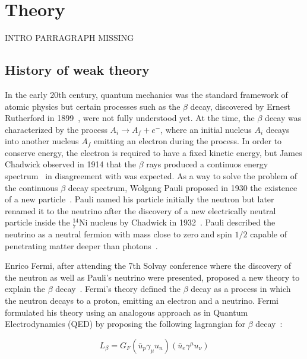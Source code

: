 \section{Theory}\label{sec:WBoson_Theory}


INTRO PARRAGRAPH MISSING


\subsection{History of weak theory}

In the early 20th century, quantum mechanics was the standard framework of atomic physics but certain processes such as the $\beta$ decay, discovered by Ernest Rutherford in 1899~\cite{RutherfordBetaDecay}, were not fully understood yet. At the time, the $\beta$ decay was characterized by the process $A_{i}\rightarrow{A_{f}+e^{-}}$, where an initial nucleus $A_{i}$ decays into another nucleus $A_{f}$ emitting an electron during the process. In order to conserve energy, the electron is required to have a fixed kinetic energy, but James Chadwick observed in 1914 that the $\beta$ rays produced a continuos energy spectrum~\cite{BetaDecay_1,BetaDecay_2} in disagreement with was expected. As a way to solve the problem of the continuous $\beta$ decay spectrum, Wolgang Pauli proposed in 1930 the existence of a new particle~\cite{Neutrino_1,Neutrino_2}. Pauli named his particle initially the neutron but later renamed it to the neutrino after the discovery of a new electrically neutral particle inside the ${}_{7}^{14}\mathrm{Ni}$ nucleus by Chadwick in 1932~\cite{Neutron}. Pauli described the neutrino as a neutral fermion with mass close to zero and spin $1/2$ capable of penetrating matter deeper than photons~\cite{Neutrino_1}.

Enrico Fermi, after attending the 7th Solvay conference where the discovery of the neutron as well as Pauli's neutrino were presented, proposed a new theory to explain the $\beta$ decay~\cite{FermiWeakTheory_1}. Fermi's theory defined the $\beta$ decay as a process in which the neutron decays to a proton, emitting an electron and a neutrino. Fermi formulated his theory using an analogous approach as in Quantum Electrodynamics (QED) by proposing the following lagrangian for $\beta$ decay~\cite{FermiWeakTheory_2}:

\begin{equation}
L_{\beta}=G_{F}\left(\bar{u}_{p}\gamma_{\mu}u_{n}\right)\left(\bar{u}_{e}\gamma^{\mu}u_{\nu}\right)
\end{equation}

